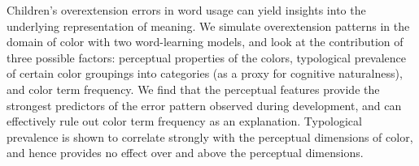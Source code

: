 Children's overextension errors in word usage can yield insights into the underlying representation of meaning. We simulate overextension patterns in the domain of color with two word-learning models, and look at the contribution of three possible factors: perceptual properties of the colors, typological prevalence of certain color groupings into categories (as a proxy for cognitive naturalness), and color term frequency. We find that the perceptual features provide the strongest predictors of the error pattern observed during development, and can effectively rule out color term frequency as an explanation. Typological prevalence is shown to correlate strongly with the perceptual dimensions of color, and hence provides no effect over and above the perceptual dimensions.
